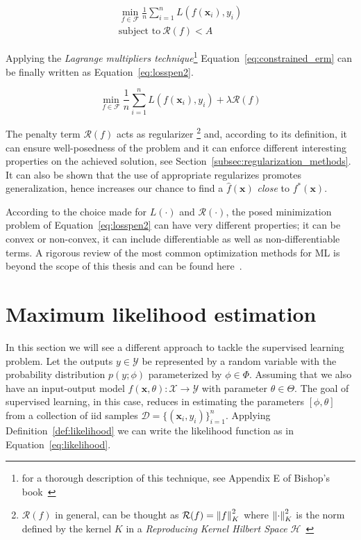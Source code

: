 \begin{equation} \label{eq:constrained_erm}
	\begin{aligned}
		\min_{f \in \mathcal{F}}{\frac{1}{n} \sum_{i=1}^{n} L(f(\bm{x}_i), y_i)} \\
		\text{subject to}~\mathcal{R}(f) < A
	\end{aligned}
\end{equation}

Applying the \textit{Lagrange multipliers technique}\footnote{for a thorough description of this technique, see Appendix E of Bishop's book~\cite{bishop2006pattern}} Equation~\eqref{eq:constrained_erm} can be finally written as Equation~\eqref{eq:losspen2}.

\begin{equation} \label{eq:losspen2}
	\min_{f \in \mathcal{F}}{\frac{1}{n} \sum_{i=1}^{n} L(f(\bm{x}_i), y_i)} + \lambda \mathcal{R}(f)
\end{equation}

The penalty term $\mathcal{R}(f)$ acts as regularizer \footnote{$\mathcal{R}(f)$ in general, can be thought as $\mathcal{R}(f) = \left\lVert f\right\rVert^2_K$ where $\left\lVert\cdot\right\rVert^2_K$ is the norm defined by the kernel $K$ in a \textit{Reproducing Kernel Hilbert Space} $\mathcal{H}$~\cite{evgeniou2000regularization}}
and, according to its definition, it can ensure well-posedness of the problem and it can enforce different interesting properties on the achieved solution, see Section~\ref{subsec:regularization_methods}. It can also be shown that the use of appropriate regularizes promotes generalization, hence increases our chance to find a $\hat f(\bm{x})$ \textit{close} to $f^*(\bm{x})$.

 According to the choice made for $L(\cdot)$ and $\mathcal{R}(\cdot)$, the posed minimization problem of Equation~\eqref{eq:losspen2} can have very different properties; it can be convex or non-convex, it can include differentiable as well as non-differentiable terms. A rigorous review of the most common optimization methods for ML is beyond the scope of this thesis and can be found here~\cite{boyd2004convex, bach2012optimization, sra2012optimization, nesterov2013introductory}.


\section{Maximum likelihood  estimation} \label{sec:mle}
In this section we will see a different approach to tackle the supervised learning problem.
Let the outputs $y \in \mathcal{Y}$ be represented by a random variable with the probability distribution $p(y;\phi)$ parameterized by $\phi \in \Phi$.
Assuming that we also have an input-output model $f(\bm{x}, \theta): \mathcal{X} \rightarrow \mathcal{Y}$ with parameter $\theta \in \Theta$. The goal of supervised learning, in this case, reduces in estimating the parameters $[\phi, \theta]$ from a collection of \ac{iid} samples $\mathcal{D} = \{(\bm{x}_i, y_i)\}_{i=1}^n$.
Applying Definition~\ref{def:likelihood} we can write the likelihood function as in Equation~\eqref{eq:likelihood}.

